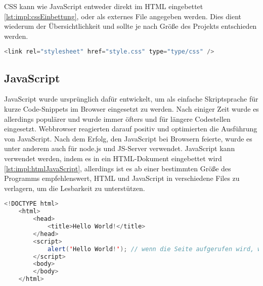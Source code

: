 CSS kann wie JavaScript entweder direkt im HTML eingebettet \ref{lst:impl:cssEinbettung}, oder als externes File angegeben werden. Dies dient wiederum der Übersichtlichkeit und sollte je nach Größe des Projekts entschieden werden.
\cite{durchstartenHTML}

\begin{lstlisting}[language=java,caption=CSS Einbettung,label=lst:impl:cssEinbettung]
    <link rel="stylesheet" href="style.css" type="type/css" />
\end{lstlisting}
 
\subsection{JavaScript}
JavaScript wurde ursprünglich dafür entwickelt, um als einfache Skriptsprache für kurze Code-Snippets im Browser eingesetzt zu werden. Nach einiger Zeit wurde es allerdings populärer und wurde immer öfters und für längere Codestellen eingesetzt. Webbrowser reagierten darauf positiv und optimierten die Ausführung von JavaScript. Nach dem Erfolg, den JavaScript bei Browsern feierte, wurde es unter anderem auch für node.js und JS-Server verwendet.
\cite{typeJavaScript}
JavaScript kann verwendet werden, indem es in ein HTML-Dokument eingebettet wird \ref{lst:impl:htmlJavaScript}, allerdings ist es ab einer bestimmten Größe des Programms empfehlenswert, HTML und JavaScript in verschiedene Files zu verlagern, um die Lesbarkeit zu unterstützen.
\cite{JavaScriptJavaEntwickler} 

\begin{lstlisting}[language=java,caption=HTML mit eingebettetem JavaScript,label=lst:impl:htmlJavaScript]
    <!DOCTYPE html>
    <html>
        <head>
            <title>Hello World!</title>
        </head>
        <script>
            alert('Hello World!'); // wenn die Seite aufgerufen wird, wird mithilfe von JavaScript ein Alert-Fenster mit 'Hello World!' ausgegeben
        </script>
        <body>
        </body>
    </html>
\end{lstlisting}